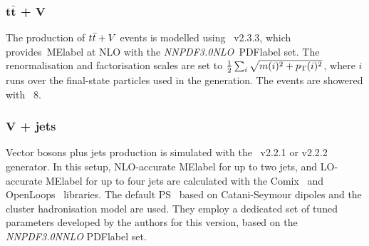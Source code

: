 \subsubsection{$\bm{t\bar{t}}$ + $\bm{V}$}
The production of $t\bar{t}+V$ events is modelled using \MGMCatNLO~v2.3.3, which provides~\acrshort{MElabel} at
NLO with the \textit{NNPDF3.0NLO}~\acrshort{PDFlabel} set. The renormalisation and factorisation scales are set to $\frac{1}{2}\sum_i\sqrt{m(i)^2+p_{\text{T}}(i)^2}$, where $i$ runs over the final-state particles used in the generation. The events are showered with \PYTHIA~8.

\subsubsection{$\bm{V}$ + jets}
Vector bosons plus jets production is simulated with the \SHERPA~v2.2.1 or v2.2.2 generator. In this setup, NLO-accurate \acrshort{MElabel} for up to two jets, and LO-accurate \acrshort{MElabel} for up to four jets are calculated with the Comix~\cite{Gleisberg_2008} and OpenLoops~\cite{PhysRevLett.108.111601,DENNER2017220} libraries. The default \SHERPA PS~\cite{Schumann_2008} based on Catani-Seymour dipoles and the cluster hadronisation model are used. They employ a dedicated set of tuned parameters developed by the \SHERPA authors for this version, based on the \textit{NNPDF3.0NNLO} \acrshort{PDFlabel} set. %

